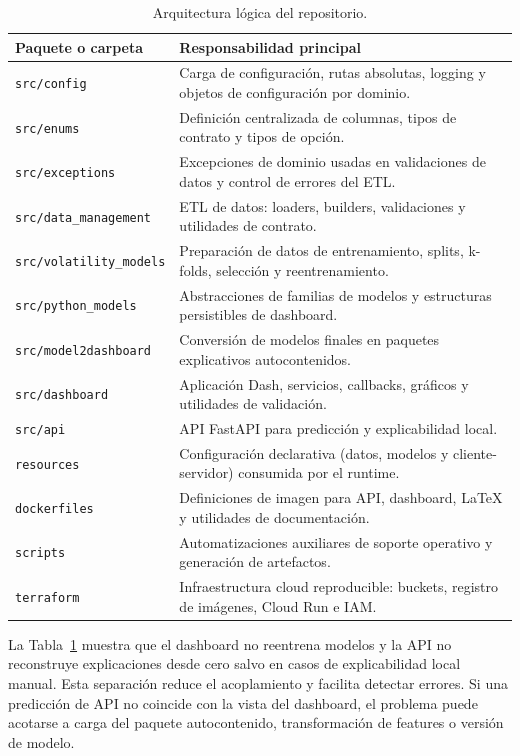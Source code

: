 \begin{table}[htbp]
\centering
\small
\begin{tabular}{p{}p{}}
\toprule
Paquete o carpeta & Responsabilidad principal \\
\midrule
\texttt{src/config} & Carga de configuración, rutas absolutas, logging y objetos de configuración por dominio. \\
\texttt{src/enums} & Definición centralizada de columnas, tipos de contrato y tipos de opción. \\
\texttt{src/exceptions} & Excepciones de dominio usadas en validaciones de datos y control de errores del ETL. \\
\texttt{src/data\_management} & ETL de datos: loaders, builders, validaciones y utilidades de contrato. \\
\texttt{src/volatility\_models} & Preparación de datos de entrenamiento, splits, k-folds, selección y reentrenamiento. \\
\texttt{src/python\_models} & Abstracciones de familias de modelos y estructuras persistibles de dashboard. \\
\texttt{src/model2dashboard} & Conversión de modelos finales en paquetes explicativos autocontenidos. \\
\texttt{src/dashboard} & Aplicación Dash, servicios, callbacks, gráficos y utilidades de validación. \\
\texttt{src/api} & API FastAPI para predicción y explicabilidad local. \\
\texttt{resources} & Configuración declarativa (datos, modelos y cliente-servidor) consumida por el runtime. \\
\texttt{dockerfiles} & Definiciones de imagen para API, dashboard, LaTeX y utilidades de documentación. \\
\texttt{scripts} & Automatizaciones auxiliares de soporte operativo y generación de artefactos. \\
\texttt{terraform} & Infraestructura cloud reproducible: buckets, registro de imágenes, Cloud Run e IAM. \\
\bottomrule
\end{tabular}
\caption{Arquitectura lógica del repositorio.}
\label{tab:arquitectura-repo}
\end{table}

La Tabla~\ref{tab:arquitectura-repo} muestra que el dashboard no reentrena modelos y la API no reconstruye explicaciones desde cero salvo en casos de explicabilidad local manual. Esta separación reduce el acoplamiento y facilita detectar errores. Si una predicción de API no coincide con la vista del dashboard, el problema puede acotarse a carga del paquete autocontenido, transformación de features o versión de modelo.

